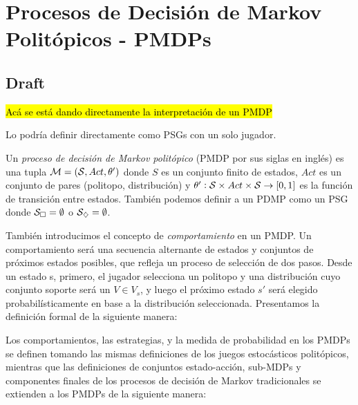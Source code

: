 \section{Procesos de Decisión de Markov Politópicos - PMDPs}
\label{sec:pmdp}

\subsection{Draft}

\hl{Acá se está dando directamente la interpretación de un PMDP}

Lo podría definir directamente como PSGs con un solo jugador.

\begin{definition}
	Un \textit{proceso de decisión de Markov politópico} (PMDP por sus siglas en inglés) es una tupla $\mathcal{M} = (\mathcal{S}, Act, \theta')$ donde $S$ es un conjunto finito de estados, $Act$ es un conjunto de pares (politopo, distribución) y $\theta': \mathcal{S} \times Act \times \mathcal{S} \rightarrow [0, 1]$ es la función de transición entre estados. También podemos definir a un PDMP como un PSG donde $\mathcal{S}_\square = \emptyset$ o $\mathcal{S}_\diamondsuit = \emptyset$.
\end{definition}

También introducimos el concepto de \textit{comportamiento} en un PMDP. Un
comportamiento será una secuencia alternante de estados y conjuntos de próximos
estados posibles, que refleja un proceso de selección de dos pasos. Desde un
estado s, primero, el jugador selecciona un politopo y una distribución cuyo
conjunto soporte será un $V \in V_s$, y luego el próximo estado $s'$ será
elegido probabilísticamente en base a la distribución seleccionada. Presentamos
la definición formal de la siguiente manera:

Los comportamientos, las estrategias, y la medida de probabilidad en los PMDPs
se definen tomando las mismas definiciones de los juegos estocásticos
politópicos, mientras que las definiciones de conjuntos estado-acción, sub-MDPs
y componentes finales de los procesos de decisión de Markov tradicionales se
extienden a los PMDPs de la siguiente manera:


